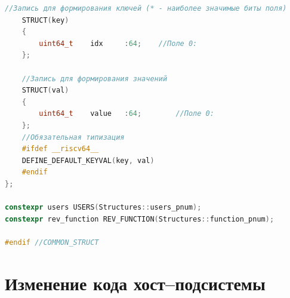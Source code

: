 \begin{lstlisting}[caption={Измененный код common\_struct.h}, label={lst:common}, language={c++}]
	//Запись для формирования ключей (* - наиболее значимые биты поля)
	STRUCT(key)
	{
		uint64_t	idx	    :64;	//Поле 0:
	};
	
	//Запись для формирования значений
	STRUCT(val)
	{
		uint64_t	value	:64;		//Поле 0:
	};
	//Обязательная типизация
	#ifdef __riscv64__
	DEFINE_DEFAULT_KEYVAL(key, val)
	#endif
};

constexpr users USERS(Structures::users_pnum);
constexpr rev_function REV_FUNCTION(Structures::function_pnum);

#endif //COMMON_STRUCT
\end{lstlisting}

\section{Изменение кода хост--подсистемы}

